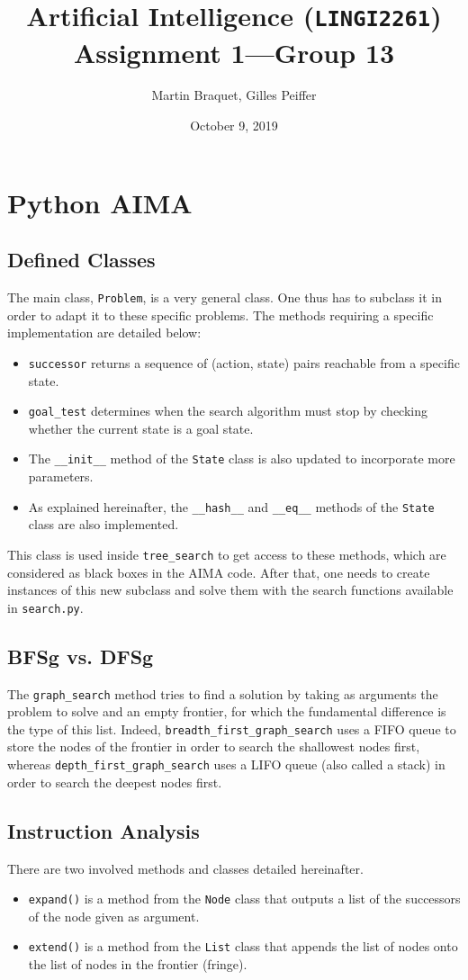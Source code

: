 \documentclass[journal]{IEEEtran}
\title{Artificial Intelligence (\texttt{LINGI2261}) \\ Assignment 1---Group 13}
\author{Martin Braquet, Gilles Peiffer}
\date{October 9, 2019}
\newcommand{\py}[1]{\texttt{#1}}
\begin{document}
\maketitle

\section{Python AIMA}
\subsection{Defined Classes}
The main class, \py{Problem}, is a very general class. One thus has to subclass it in order to adapt it to these specific problems.
 The methods requiring a specific implementation are detailed below:
 \begin{itemize}
  \item \py{successor} returns a sequence of (action, state) pairs reachable from a specific state.
  \item \py{goal_test} determines when the search algorithm must stop by checking whether the current state is a goal state.
  \item The \py{__init__} method of the \py{State} class is also updated to incorporate more parameters.
  \item As explained hereinafter, the \py{__hash__} and \py{__eq__} methods of the \py{State} class are also implemented.
 \end{itemize}
This class is used inside \py{tree_search} to get access to these methods, which are considered as black boxes in the AIMA code.
 After that, one needs to create instances of this new subclass and solve them with the search functions available in \py{search.py}.
 \subsection{BFSg vs. DFSg}
 The \py{graph_search} method tries to find a solution by taking as arguments the problem to solve and an empty frontier, for which the fundamental difference is the type of this list.
 Indeed, \py{breadth_first_graph_search} uses a FIFO queue to store the nodes of the frontier in order to search the shallowest nodes first, whereas \py{depth_first_graph_search} uses a LIFO queue  (also called a stack) in order to search the deepest nodes first.
 \subsection{Instruction Analysis}
 There are two involved methods and classes detailed hereinafter.
 \begin{itemize}
 	\item \py{expand()} is a method from the \py{Node} class that outputs a list of the successors of the node given as argument.
 	\item \py{extend()} is a method from the \py{List} class that appends the list of nodes onto the list of nodes in the frontier (fringe).
 \end{itemize}
\end{document}
